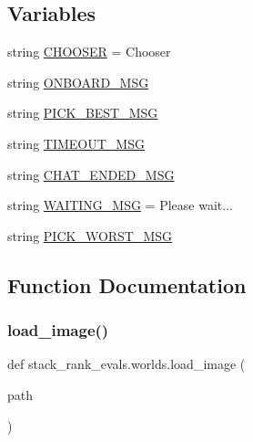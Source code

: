 \subsection*{Variables}
\begin{DoxyCompactItemize}
\item 
string \hyperlink{namespacestack__rank__evals_1_1worlds_a8560c43642aa1a65c612a91bcf5d3234}{C\+H\+O\+O\+S\+ER} = \textquotesingle{}Chooser\textquotesingle{}
\item 
string \hyperlink{namespacestack__rank__evals_1_1worlds_a5d618971ea12eba5a98b21ef748c9e27}{O\+N\+B\+O\+A\+R\+D\+\_\+\+M\+SG}
\item 
string \hyperlink{namespacestack__rank__evals_1_1worlds_ad769bd6f83753c0f09c5edb4e5e55678}{P\+I\+C\+K\+\_\+\+B\+E\+S\+T\+\_\+\+M\+SG}
\item 
string \hyperlink{namespacestack__rank__evals_1_1worlds_a7871caf8745dbbcc6f50fcf1777c7225}{T\+I\+M\+E\+O\+U\+T\+\_\+\+M\+SG}
\item 
string \hyperlink{namespacestack__rank__evals_1_1worlds_adf99bb90bd705b460eb08bfdf5f1ccec}{C\+H\+A\+T\+\_\+\+E\+N\+D\+E\+D\+\_\+\+M\+SG}
\item 
string \hyperlink{namespacestack__rank__evals_1_1worlds_a483bf761928ce74cf15f134bc15a355d}{W\+A\+I\+T\+I\+N\+G\+\_\+\+M\+SG} = \textquotesingle{}Please wait...\textquotesingle{}
\item 
string \hyperlink{namespacestack__rank__evals_1_1worlds_a968f31845a86d59d1fe2e14e8a5d636f}{P\+I\+C\+K\+\_\+\+W\+O\+R\+S\+T\+\_\+\+M\+SG}
\end{DoxyCompactItemize}


\subsection{Function Documentation}
\mbox{\label{namespacestack__rank__evals_1_1worlds_a0174c3e372a345f192cef824e4c5528d}} 
\subsubsection{\texorpdfstring{load\+\_\+image()}{load\_image()}}
{\footnotesize\ttfamily def stack\+\_\+rank\+\_\+evals.\+worlds.\+load\+\_\+image (\begin{DoxyParamCaption}\item[{}]{path }\end{DoxyParamCaption})}



